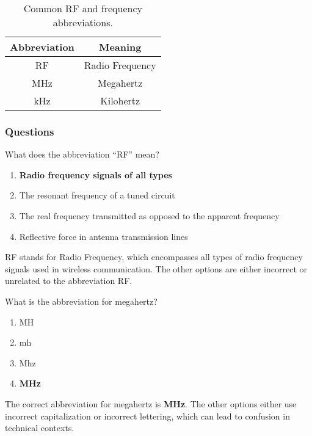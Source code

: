 \begin{table}[h]
    \centering
    \begin{tabular}{|c|c|}
        \hline
        \textbf{Abbreviation} & \textbf{Meaning} \\
        \hline
        RF & Radio Frequency \\
        MHz & Megahertz \\
        kHz & Kilohertz \\
        \hline
    \end{tabular}
    \caption{Common RF and frequency abbreviations.}
    \label{tab:rf-abbreviations}
\end{table}

\subsubsection{Questions}

\begin{tcolorbox}[colback=gray!10!white,colframe=black!75!black,title={T5C06}]
    What does the abbreviation “RF” mean?
    \begin{enumerate}[label=\Alph*),noitemsep]
        \item \textbf{Radio frequency signals of all types}
        \item The resonant frequency of a tuned circuit
        \item The real frequency transmitted as opposed to the apparent frequency
        \item Reflective force in antenna transmission lines
    \end{enumerate}
\end{tcolorbox}

RF stands for Radio Frequency, which encompasses all types of radio frequency signals used in wireless communication. The other options are either incorrect or unrelated to the abbreviation RF.

\begin{tcolorbox}[colback=gray!10!white,colframe=black!75!black,title={T5C07}]
    What is the abbreviation for megahertz?
    \begin{enumerate}[label=\Alph*),noitemsep]
        \item MH
        \item mh
        \item Mhz
        \item \textbf{MHz}
    \end{enumerate}
\end{tcolorbox}

The correct abbreviation for megahertz is \textbf{MHz}. The other options either use incorrect capitalization or incorrect lettering, which can lead to confusion in technical contexts.
